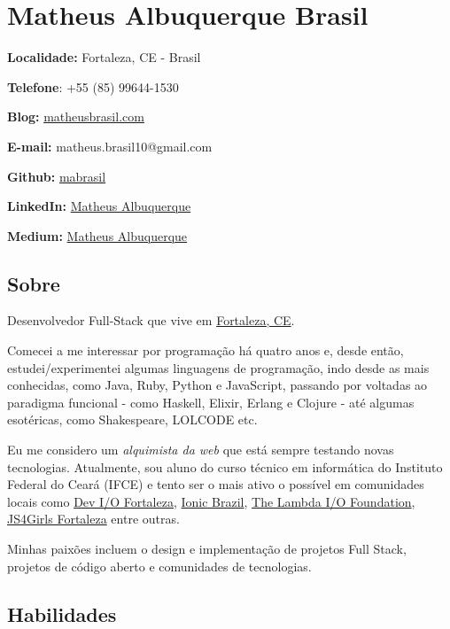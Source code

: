 \documentclass[]{article}
\date{}
\begin{document}
\section{Matheus Albuquerque Brasil}\label{matheus-albuquerque-brasil}

\textbf{Localidade:} Fortaleza, CE - Brasil

\textbf{Telefone}: +55 (85) 99644-1530

\textbf{Blog:} \href{http://matheusbrasil.com}{matheusbrasil.com}

\textbf{E-mail:} matheus.brasil10@gmail.com

\textbf{Github:} \href{https://github.com/mabrasil}{mabrasil}

\textbf{LinkedIn:}
\href{https://www.linkedin.com/in/matheusalbuquerque}{Matheus
Albuquerque}

\textbf{Medium:} \href{https://medium.com/@matheusalbuquerque}{Matheus
Albuquerque}

\subsection{Sobre}\label{sobre}

Desenvolvedor Full-Stack que vive em
\href{http://pt.wikipedia.org/wiki/Fortaleza}{Fortaleza, CE}.

Comecei a me interessar por programação há quatro anos e, desde então,
estudei/experimentei algumas linguagens de programação, indo desde as
mais conhecidas, como Java, Ruby, Python e JavaScript, passando por
voltadas ao paradigma funcional - como Haskell, Elixir, Erlang e Clojure
- até algumas esotéricas, como Shakespeare, LOLCODE etc.

Eu me considero um \emph{alquimista da web} que está sempre testando
novas tecnologias. Atualmente, sou aluno do curso técnico em informática
do Instituto Federal do Ceará (IFCE) e tento ser o mais ativo o possível
em comunidades locais como
\href{https://www.facebook.com/groups/fortalezadevelopers/}{Dev I/O
Fortaleza}, \href{http://ionicbrazil.com/}{Ionic Brazil},
\href{https://github.com/lambda-io}{The Lambda I/O Foundation},
\href{http://js4girls-fortaleza.github.io/}{JS4Girls Fortaleza} entre
outras.

Minhas paixões incluem o design e implementação de projetos Full Stack,
projetos de código aberto e comunidades de tecnologias.

\subsection{Habilidades}\label{habilidades}
\end{document}
